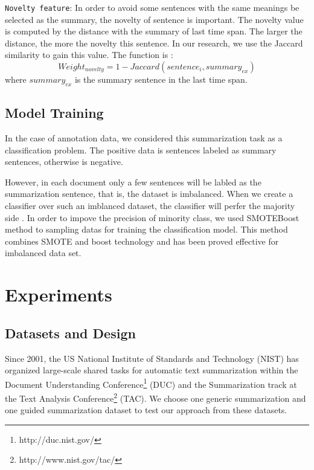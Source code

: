 \documentclass{acm_proc_article-sp}
\begin{document}
\texttt{Novelty feature}: In order to avoid some sentences with the same meanings be selected as the summary, the novelty of sentence is important. 
The novelty value is computed by the distance with the summary of last time span. 
The larger the distance, the more the novelty this sentence. 
In our research, we use the Jaccard similarity to gain this value. The function is :
\begin{equation}
Weight_{novelty} = 1 - Jaccard(sentence_i, summary_{ex})
\end{equation}
where $summary_{ex}$ is the summary sentence in the last time span.



\subsection{Model Training}

In the case of annotation data, we considered this summarization task as a classification problem. The positive data is sentences labeled as summary sentences, otherwise is negative. 

However, in each document only a few sentences will be labled as the summarization sentence, that is, the dataset is imbalanced. 
When we create a classifier over such an imblanced dataset, the classifier will perfer the majority side \cite{chawla2003smoteboost}.
In order to impove the precision of minority class, we used SMOTEBoost\cite{chawla2003smoteboost} method to sampling datas for training the classification model. 
This method combines SMOTE \cite{chawla2011smote} and boost technology and has been proved effective for imbalanced data set. 


%
\section{Experiments}
%

\subsection{Datasets and Design}

Since 2001, the US National Institute of Standards and Technology (NIST) has organized large-scale shared tasks for automatic text summarization within the Document Understanding Conference\footnote{http://duc.nist.gov/} (DUC) and the Summarization track at the Text Analysis Conference\footnote{http://www.nist.gov/tac/} (TAC).
We choose one generic summarization and one guided summarization dataset to test our approach from these datasets.
\end{document}
